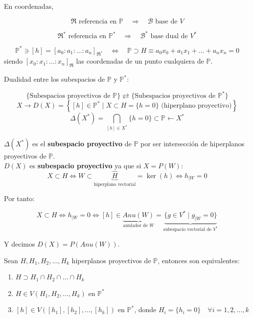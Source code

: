 En coordenadas, 

\[
    \mathfrak{R} \text{ referencia en } \mathbb{P} \quad \Rightarrow \quad \mathcal{B} \text{ base de } V  
\]

\[
    \mathfrak{R}^* \text{ referencia en } \mathbb{P}^* \quad \Rightarrow \quad \mathcal{B}^* \text{ base dual de } V^*
\]

\[
    \mathbb{P}^* \ni [h] = [a_0 : a_1 : \ldots : a_n]_{\mathfrak{R}^*} \quad \Leftrightarrow \quad \mathbb{P} \supset H \equiv a_0x_0 + a_1x_1 + \ldots + a_nx_n = 0
\]
siendo $[x_0 : x_1 : \ldots : x_n]_{\mathfrak{R}}$ las coordenadas de un punto cualquiera de $\mathbb{P}$.

Dualidad entre los subespacios de $\mathbb{P}$ y $\mathbb{P}^*$:

\[
    \{ \text{Subespacios proyectivos de } \mathbb{P} \} \rightleftarrows  \{ \text{Subespacios proyectivos de } \mathbb{P}^* \}
\]
\[  
    X \to D(X) = \left\{[h] \in \mathbb{P}^* \mid X \subset H = \{h = 0\} \text{ (hiperplano proyectivo)} \right\}
\]
\[
    \Delta(X^*) = \bigcap_{[h] \in X^*} \{h = 0\} \subset \mathbb{P} \leftarrow X^* 
\]

$\Delta(X^*)$ es el \textbf{subespacio proyectivo} de $\mathbb{P}$ por ser intersección de hiperplanos proyectivos de $\mathbb{P}$.\\

$D(X)$ es \textbf{subespacio proyectivo} ya que si $X=P(W)$:\\
\[
    X \subset H \iff 
    W \subset \underbrace{\hat{H}}_{\text{hiperplano vectorial}} = \ker(h) \iff 
    h_{|W} = 0
\]

Por tanto:

\[
    X \subset H \iff
    h_{|W} = 0 \iff
    [h] \in \underbrace{Anu(W)}_{\text{anulador de } W} = \underbrace{\{ g \in V^* \mid g_{|W} = 0 \}}_{\text{subespacio vectorial de } V^*}
\]

Y decimos $D(X) = P(Anu(W))$.

\begin{lema}
    Sean $H, H_1, H_2, \ldots, H_k$ hiperplanos proyectivos de $\mathbb{P}$, entonces son equivalentes:
    \begin{enumerate}
        \item $H \supset H_1 \cap H_2 \cap \ldots \cap H_k$
        \item $H \in V \left( H_1, H_2, \ldots, H_k \right)$ en $\mathbb{P}^*$
        \item $[h] \in V \left( [h_1], [h_2], \ldots, [h_k] \right)$ en $\mathbb{P}^*$, donde $H_i = \{h_i = 0\} \quad \forall i = 1, 2, \ldots, k$
    \end{enumerate}
\end{lema}

